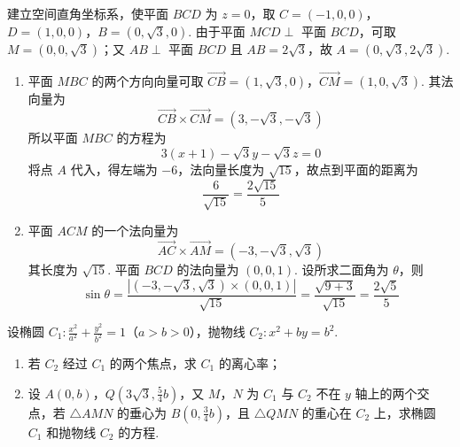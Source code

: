 \begin{solution}
建立空间直角坐标系，使平面 \(BCD\) 为 \(z=0\)，取
\(C=(-1,0,0)\)，\(D=(1,0,0)\)，\(B=(0,\sqrt3,0)\).
由于平面 \(MCD\perp\) 平面 \(BCD\)，可取 \(M=(0,0,\sqrt3)\)；又 \(AB\perp\) 平面 \(BCD\) 且 \(AB=2\sqrt3\)，故 \(A=(0,\sqrt3,2\sqrt3)\).

\begin{enumerate}
\item 平面 \(MBC\) 的两个方向向量可取
\(\overrightarrow{CB}=(1,\sqrt3,0)\)，\(\overrightarrow{CM}=(1,0,\sqrt3)\).
其法向量为
\[
\overrightarrow{CB}\times\overrightarrow{CM}=(3,-\sqrt3,-\sqrt3)
\]
所以平面 \(MBC\) 的方程为
\[
3(x+1)-\sqrt3y-\sqrt3z=0
\]
将点 \(A\) 代入，得左端为 \(-6\)，法向量长度为 \(\sqrt{15}\)，故点到平面的距离为
\[
\frac{6}{\sqrt{15}}=\frac{2\sqrt{15}}5
\]
\item 平面 \(ACM\) 的一个法向量为
\[
\overrightarrow{AC}\times\overrightarrow{AM}=(-3,-\sqrt3,\sqrt3)
\]
其长度为 \(\sqrt{15}\). 平面 \(BCD\) 的法向量为 \((0,0,1)\). 设所求二面角为 \(\theta\)，则
\[
\sin\theta
=\frac{\left|(-3,-\sqrt3,\sqrt3)\times(0,0,1)\right|}{\sqrt{15}}
=\frac{\sqrt{9+3}}{\sqrt{15}}
=\frac{2\sqrt5}{5}
\]
\end{enumerate}
\end{solution}

\begin{problem}
设椭圆 \(C_{1}:\frac{x^{2}}{a^{2}}+\frac{y^{2}}{b^{2}}=1\)（\(a>b>0\)），抛物线 \(C_{2}:x^{2}+by=b^{2}\).

\begin{enumerate}
\item 若 \(C_{2}\) 经过 \(C_{1}\) 的两个焦点，求 \(C_{1}\) 的离心率；
\item 设 \(A(0,b)\)，\(Q\!\left(3\sqrt{3}, \frac{5}{4}b\right)\)，又 \(M\)，\(N\) 为 \(C_{1}\) 与 \(C_{2}\) 不在 \(y\) 轴上的两个交点，若 \(\triangle AMN\) 的垂心为 \(B\!\left(0,\frac{3}{4}b\right)\)，且 \(\triangle QMN\) 的重心在 \(C_{2}\) 上，求椭圆 \(C_{1}\) 和抛物线 \(C_{2}\) 的方程.
\end{enumerate}
\end{problem}

